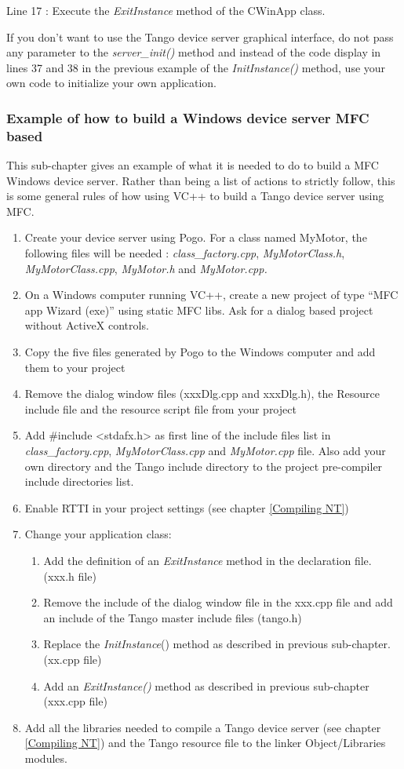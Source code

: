 Line 17 : Execute the \emph{ExitInstance} method of the CWinApp class.

If you don't want to use the Tango device server graphical interface,
do not pass any parameter to the \emph{server\_init()}
method and instead of the code display in lines 37 and 38 in the previous
example of the \emph{InitInstance()} method, use your own code to
initialize your own application.


\subsubsection{Example of how to build a Windows device server MFC based}

This sub-chapter gives an example of what it is needed to do to build
a MFC Windows device server. Rather than being a list of actions to
strictly follow, this is some general rules of how using VC++ to build
a Tango device server using MFC.
\begin{enumerate}
\item Create your device server using Pogo. For a class named MyMotor, the
following files will be needed : \emph{class\_factory.cpp}, \emph{MyMotorClass.h},
\emph{MyMotorClass.cpp}, \emph{MyMotor.h} and \emph{MyMotor.cpp.}
\item On a Windows computer running VC++, create a new project of type ``MFC
app Wizard (exe)'' using static MFC libs. Ask for a dialog
based project without ActiveX controls.
\item Copy the five files generated by Pogo to the Windows computer and
add them to your project
\item Remove the dialog window files (xxxDlg.cpp and xxxDlg.h), the Resource
include file and the resource script file from your project
\item Add \#include <stdafx.h> as first line of the include files list in
\emph{class\_factory.cpp}, \emph{MyMotorClass.cpp} and \emph{MyMotor.cpp}
file. Also add your own directory and the Tango include directory
to the project pre-compiler include directories list.
\item Enable RTTI in your project settings (see chapter \ref{Compiling NT})
\item Change your application class: 

\begin{enumerate}
\item Add the definition of an \emph{ExitInstance} method in the declaration
file. (xxx.h file)
\item Remove the include of the dialog window file in the xxx.cpp file and
add an include of the Tango master include files (tango.h)
\item Replace the \emph{InitInstance}() method as described in previous
sub-chapter. (xx.cpp file)
\item Add an \emph{ExitInstance()} method as described in previous sub-chapter
(xxx.cpp file)
\end{enumerate}
\item Add all the libraries needed to compile a Tango device server (see
chapter \ref{Compiling NT}) and the Tango resource file to the linker
Object/Libraries modules.
\end{enumerate}


